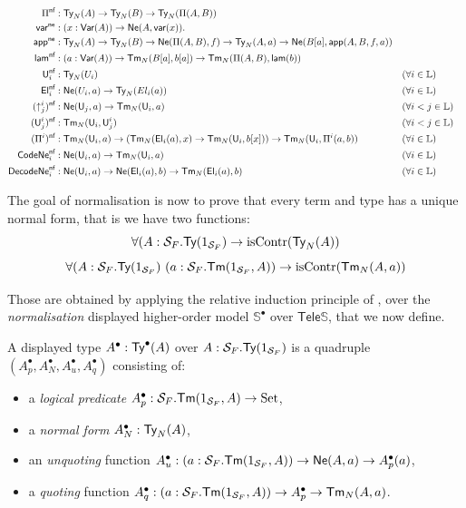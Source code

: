 \documentclass{article}
\begin{document}
    \begin{align*}
        \Pi^{\textsf{nf}} &: \textsf{Ty}_N(A) \rightarrow \textsf{Ty}_N(B) \rightarrow \textsf{Ty}_N(\Pi(A,B))\\
        \textsf{var}^{\textsf{ne}} &: (x:\textsf{Var}(A)) \rightarrow \textsf{Ne}(A,\textsf{var}(x)).\\ 
        \textsf{app}^{\textsf{ne}} &: \textsf{Ty}_N(A) \rightarrow  \textsf{Ty}_N(B) \rightarrow \textsf{Ne}(\Pi(A,B),f) \rightarrow \textsf{Ty}_N(A,a) \rightarrow \textsf{Ne}(B[a],\textsf{app}(A,B,f,a))\\
        \textsf{lam}^{\textsf{nf}} &: (a:\textsf{Var}(A)) \rightarrow \textsf{Tm}_N(B[a],b[a]) \rightarrow \textsf{Tm}_N(\Pi(A,B),\textsf{lam}(b))\\
        \textsf{U}_i^{\textsf{nf}} &: \textsf{Ty}_N(U_i) && (\forall i \in \mathbb{L})\\
        \textsf{El}_i^{\textsf{nf}} &: \textsf{Ne}(U_i,a) \rightarrow \textsf{Ty}_N(El_i(a)) && (\forall i \in \mathbb{L})\\
        (\uparrow_j^i)^{\textsf{nf}} &: \textsf{Ne}(\textsf{U}_j,a) \rightarrow \textsf{Tm}_N(\textsf{U}_i,a) && (\forall i < j \in \mathbb{L})\\
        (\textsf{U}_j^i)^{\textsf{nf}} &: \textsf{Tm}_N(\textsf{U}_i,\textsf{U}_j^i) && (\forall i<j \in \mathbb{L})\\
        (\Pi^i)^{\textsf{nf}} &: \textsf{Tm}_N(\textsf{U}_i,a) \rightarrow (\textsf{Tm}_N(\textsf{El}_i(a),x) \rightarrow \textsf{Tm}_N(\textsf{U}_i,b[x])) \rightarrow \textsf{Tm}_N(\textsf{U}_i, \Pi^i(a,b)) && (\forall i \in \mathbb{L})\\
        \mathsf{CodeNe}^{\textsf{nf}}_i &: \textsf{Ne}(\textsf{U}_i,a) \rightarrow \textsf{Tm}_N(\textsf{U}_i,a) && (\forall i \in \mathbb{L})\\
        \mathsf{DecodeNe}^{\textsf{nf}}_i &: \textsf{Ne}(\textsf{U}_i,a) \rightarrow \textsf{Ne}(\textsf{El}_i(a),b) \rightarrow \textsf{Tm}_N(\textsf{El}_i(a),b) && (\forall i \in \mathbb{L})
    \end{align*}

The goal of normalisation is now to prove that every term and type has a unique normal form, that is we have two functions:
\[ \forall(A:\mathcal{S}_F.\textsf{Ty}(1_{\mathcal{S}_F}) \rightarrow \text{isContr}(\textsf{Ty}_N(A))\]
\[ \forall(A:\cS_F.\Ty(1_{\cS_F}) \ (a:\cS_F.\Tm(1_{\cS_F},A)) \rightarrow \text{isContr}(\Tm_N(A,a))\]

Those are obtained by applying the relative induction principle of \cite{sconing}, over the \textit{normalisation} displayed higher-order model $\mathbb{S}^\bullet$ over $\mathsf{Tele}\mathbb{S}$,
that we now define.

A displayed type $A^\bullet : \textsf{Ty}^\bullet(A)$ over $A : \mathcal{S}_F.\textsf{Ty}(1_{\mathcal{S}_F})$ is a quadruple $(A_p^\bullet,A_N^\bullet,A_u^\bullet,A_q^\bullet)$ consisting of:
\begin{itemize}
    \item a \textit{logical predicate}  $A_p^\bullet : \mathcal{S}_F.\textsf{Tm}(1_{\mathcal{S}_F},A) \rightarrow \text{Set}$,
    \item a \textit{normal form} $A_N^\bullet : \textsf{Ty}_N(A)$,
    \item an \textit{unquoting} function $A_u^\bullet : (a: \mathcal{S}_F.\textsf{Tm}(1_{\mathcal{S}_F},A)) \rightarrow \textsf{Ne}(A,a) \rightarrow A_p^\bullet(a)$,
    \item a \textit{quoting} function $A_q^\bullet : (a: \mathcal{S}_F.\textsf{Tm}(1_{\mathcal{S}_F},A)) \rightarrow A_p^\bullet \rightarrow \textsf{Tm}_N(A,a)$.
\end{itemize}
  
\end{document}
